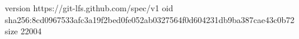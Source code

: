 version https://git-lfs.github.com/spec/v1
oid sha256:8cd0967533afc3a19f2bed0fe052ab0327564f0d604231db9ba387cae43c0b72
size 22004
